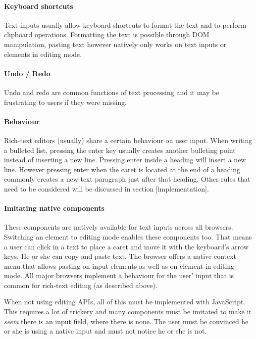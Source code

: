 \paragraph{Keyboard shortcuts} Text inputs usually allow keyboard shortcuts to format the text and to perform clipboard operations. Formatting the text is possible through DOM manipulation, pasting text however natively only works on text inputs or elements in editing mode. %

\paragraph{Undo / Redo} Undo and redo are common functions of text processing and it may be frustrating to users if they were missing.

\paragraph{Behaviour} Rich-text editors (usually) share a certain behaviour on user input. When writing a bulleted list, pressing the enter key usually creates another bulleting point instead of inserting a new line. Pressing enter inside a heading will insert a new line. However pressing enter when the caret is located at the end of a heading commonly creates a new text paragraph just after that heading. Other rules that need to be considered will be discussed in section [implementation].

\paragraph{Imitating native components} These components are natively available for text inputs across all browsers. Switching an element to editing mode enables these components too. That means a user can click in a text to place a caret and move it with the keyboard's arrow keys. He or she can copy and paste text. The browser offers a native context menu that allows pasting on input elements as well as on element in editing mode. All major browsers implement a behaviour for the user' input that is common for rich-text editing (as described above).

When not using editing APIs, all of this must be implemented with JavaScript. This requires a lot of trickery and many components must be imitated to make it \textit{seem} there is an input field, where there is none. The user must be convinced he or she is using a native input and must not notice he or she is not.

